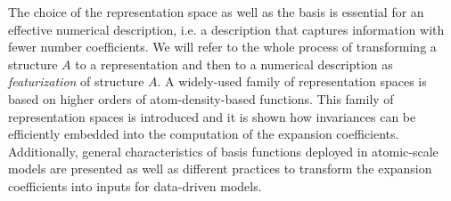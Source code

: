 The choice of the representation space as well as the basis is essential for an effective numerical description, i.e. a description that captures information with fewer number coefficients. 
We will refer to the whole process of transforming a structure $A$ to a representation and then to a numerical description as \emph{featurization} of structure $A$.
A widely-used family of representation spaces is based on higher orders of atom-density-based functions.
This family of representation spaces is introduced and it is shown how invariances can be efficiently embedded into the computation of the expansion coefficients.
Additionally, general characteristics of basis functions deployed in atomic-scale models are presented as well as different practices to transform the expansion coefficients into inputs for data-driven models.
 
